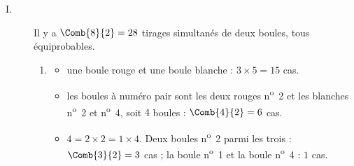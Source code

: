 	\begin{description}
		\item[I.] Il y a $\Comb{8}{2} = 28$ tirages simultanés de deux boules, tous équiprobables.
			\begin{enumerate}
				\item \begin{itemize}
					\item {} une boule rouge et une boule blanche : $3 \times 5 = 15$ cas.

					\item {} les boules à numéro pair sont les deux rouges n\textsuperscript{o}~2 et les
						blanches n\textsuperscript{o}~2 et n\textsuperscript{o}~4, soit $4$ boules : $\Comb{4}{2} = 6$ cas.

					\item {} $4 = 2 \times 2 = 1 \times 4$.
						Deux boules n\textsuperscript{o}~2 parmi les trois : $\Comb{3}{2} = 3$ cas ;
						la boule n\textsuperscript{o}~1 et la boule n\textsuperscript{o}~4 : $1$ cas.


\end{itemize}
\end{enumerate}
\end{description}
